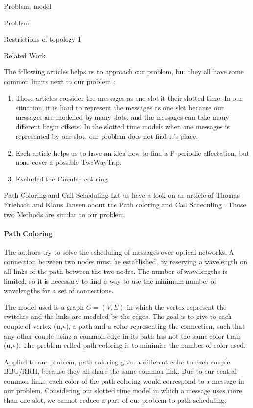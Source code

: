 \documentclass[a4paper,10pt]{report}
\begin{document}
\begin{chapter}{Problem, model}
\begin{section}{Problem}
\begin{subsection}{Restrictions of topology 1}
\end{subsection}
\end{section}
\begin{section}{Related Work}

The following articles helps us to approach our problem, but they all have some common limits next to our problem :
\begin{enumerate}
 \item Those articles consider the messages as one slot it their slotted time. In our situation, it is hard to represent the messages as one slot because our messages are modelled by many slots, and the messages can take many different begin offsets. In the slotted time models when one messages is represented by one slot, our problem does not find it's place.
 \item Each article helps us to have an idea how to find a P-periodic affectation, but none cover a possible TwoWayTrip. 
 \item Excluded the Circular-coloring.
 
\end{enumerate}

\begin{subsection}{Path Coloring and Call Scheduling}
Let us have a look on an article of Thomas Erlebach and Klaus Jansen about the Path coloring and Call Scheduling \cite{erlebach2001complexity}.
Those two Methods are similar to our problem.

\paragraph{Path Coloring}
The authors try to solve the scheduling of messages over optical networks. A connection between two nodes must be established, by reserving a wavelength on all links of the
path between the two nodes. The number of wavelengths is limited, so it is necessary to find a way to use the minimum number of wavelengths for a set 
of connections.

The model used is a graph $G=(V,E)$ in which the vertex represent the switches and the links are modeled by the edges. The goal is to give to each
couple of vertex (u,v), a path and a color representing the connection, such that any other couple using a common edge in its path has not the same
color than (u,v). The problem called path coloring is to minimise the number of color used.

Applied to our problem, path coloring gives a different color to each couple BBU/RRH, because they all share the same common link.
Due to our central common links, each color of the path coloring
would correspond to a message in our problem. Considering our slotted time model in which a message uses more than one slot,
we cannot reduce a part of our problem to path scheduling.


\end{subsection}
\end{section}
\end{chapter}
\end{document}
